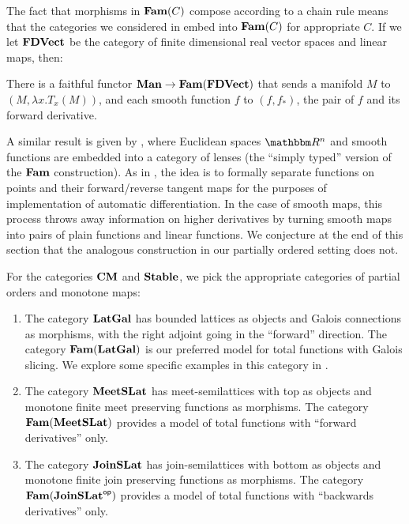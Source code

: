 The fact that morphisms in $\mathbf{Fam}(C)$ compose according to a chain rule
means that the categories we considered in 
embed into $\mathbf{Fam}(C)$ for appropriate $C$. If we let $\mathbf{FDVect}$ be the
category of finite dimensional real vector spaces and linear maps,
then:

\begin{proposition}
  \label{prop:embed-manifolds}
  There is a faithful functor $\mathbf{Man} \to \mathbf{Fam}(\mathbf{FDVect})$ that sends a
  manifold $M$ to $(M, \lambda x. T_x(M))$, and each smooth function
  $f$ to $(f, f_*)$, the pair of $f$ and its forward derivative.
\end{proposition}

A similar result is given by \citet{cruttwell2022}, where Euclidean
spaces $\RR^n$ and smooth functions are embedded into a category of
lenses (the ``simply typed'' version of the $\mathbf{Fam}$ construction). As
in \citet{vakar22}, the idea is to formally separate functions on
points and their forward/reverse tangent maps for the purposes of
implementation of automatic differentiation. In the case of smooth
maps, this process throws away information on higher derivatives by
turning smooth maps into pairs of plain functions and linear
functions. We conjecture at the end of this section that the analogous
construction in our partially ordered setting does not.

For the categories $\mathbf{CM}$ and $\mathbf{Stable}$, we pick the appropriate
categories of partial orders and monotone maps:

\begin{enumerate}[leftmargin=\enummargin]
\item The category $\mathbf{LatGal}$ has bounded lattices as objects and
  Galois connections as morphisms, with the right adjoint going in the
  ``forward'' direction. The category $\mathbf{Fam}(\mathbf{LatGal})$ is our preferred
  model for total functions with Galois slicing. We explore some
  specific examples in this category in .
\item The category $\mathbf{MeetSLat}$ has meet-semilattices with top as
  objects and monotone finite meet preserving functions as
  morphisms. The category $\mathbf{Fam}(\mathbf{MeetSLat})$ provides a model of
  total functions with ``forward derivatives'' only.
\item The category $\mathbf{JoinSLat}$ has join-semilattices with bottom as
  objects and monotone finite join preserving functions as
  morphisms. The category $\mathbf{Fam}(\mathbf{JoinSLat}^{\mathsf{op}})$ provides a model of
  total functions with ``backwards derivatives'' only.
\end{enumerate}

